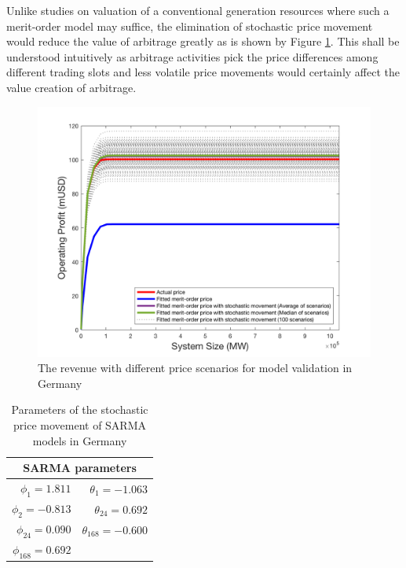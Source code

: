 Unlike studies on valuation of a conventional generation resources where such a merit-order model may suffice, the elimination of stochastic price movement would reduce the value of arbitrage greatly as is shown by Figure \ref{fig:model-validation}. This shall be understood intuitively as arbitrage activities pick the price differences among different trading slots and less volatile price movements would certainly affect the value creation of arbitrage.

\begin{figure}[h!]
	\centering
	\includegraphics[width=0.95\linewidth]{Figures/6_Model_Validation}
	\caption{The revenue with different price scenarios for model validation in Germany}
	\label{fig:model-validation}
\end{figure}

\begin{table}[h!]
	\centering
	\begin{tabular}{r r}
		\hline
		\multicolumn{2}{c}{SARMA parameters}\\
		\hline
		$\phi_1 = 1.811$ & $\theta_1 = -1.063$ \\
		$\phi_2 = -0.813$ & $\theta_{24} =0.692$ \\
		$\phi_{24} = 0.090$ & $\theta_{168} = -0.600$ \\
		$\phi_{168} = 0.692$ & \\
		\hline
	\end{tabular}
	\caption{Parameters of the stochastic price movement of SARMA models in Germany}\label{tab:SARMA}
\end{table}

